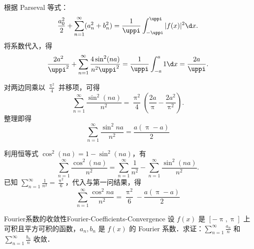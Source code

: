 \begin{solution}
    根据 Parseval 等式：
    \begin{equation}\label{eq:parseval-4}
        \frac{a_0^2}{2} + \sum_{n=1}^{\infty} (a_n^2 + b_n^2) = \frac{1}{\uppi} \int_{-\uppi}^{\uppi} |f(x)|^2 \d x.
    \end{equation}
    将系数代入，得
    \begin{equation}\label{eq:subs-5}
        \frac{2a^2}{\uppi^2} + \sum_{n=1}^{\infty} \frac{4\sin^2(na)}{n^2\uppi^2} = \frac{1}{\uppi} \int_{-a}^{a} 1 \d x = \frac{2a}{\uppi}.
    \end{equation}


    对两边同乘以 $\frac{\uppi^2}{4}$ 并移项，可得
    \begin{equation}\label{eq:sinsum-6}
        \sum_{n=1}^{\infty} \frac{\sin^2(na)}{n^2} = \frac{\uppi^2}{4} \left( \frac{2a}{\uppi} - \frac{2a^2}{\uppi^2} \right).
    \end{equation}
    整理即得
    \begin{equation}
        \boxed{\sum_{n=1}^{\infty} \frac{\sin^2 na}{n^2} = \frac{a(\uppi - a)}{2}}
    \end{equation}


    利用恒等式 $\cos^2(na) = 1 - \sin^2(na)$，有
    \begin{equation}\label{eq:cossum-7}
        \sum_{n=1}^{\infty} \frac{\cos^2(na)}{n^2} = \sum_{n=1}^{\infty} \frac{1}{n^2} - \sum_{n=1}^{\infty} \frac{\sin^2(na)}{n^2}.
    \end{equation}
    已知 $\sum_{n=1}^{\infty} \frac{1}{n^2} = \frac{\uppi^2}{6}$，代入与第一问结果，得
    \begin{equation}
        \boxed{\sum_{n=1}^{\infty} \frac{\cos^2 na}{n^2} = \frac{\uppi^2}{6} - \frac{a(\uppi - a)}{2}}
    \end{equation}
\end{solution}

\begin{problem}{Fourier系数的收敛性}{Fourier-Coefficients-Convergence}
    设 $f(x)$ 是 $[-\uppi, \uppi]$ 上可积且平方可积的函数，$a_n, b_n$ 是 $f(x)$ 的 Fourier 系数．求证：$\sum_{n=1}^{\infty} \frac{a_n}{n}$ 和 $\sum_{n=1}^{\infty} \frac{b_n}{n}$ 收敛．
\end{problem}

